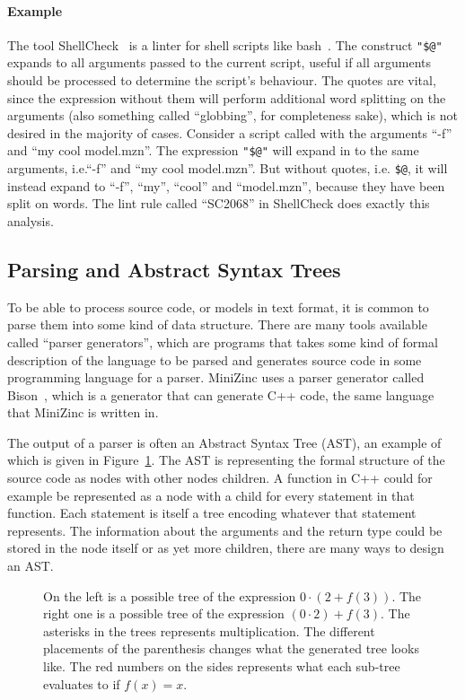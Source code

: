 \documentclass[a4paper,12pt]{article}
\begin{document}
\paragraph{Example}
The tool ShellCheck~\cite{shellcheck} is a linter for shell scripts like
bash~\cite{bash}. The construct \texttt{"\$@"} expands to all arguments passed to the
current script, useful if all arguments should be processed to determine the script's
behaviour. The quotes are vital, since the expression without them will perform additional
word splitting on the arguments (also something called ``globbing'', for completeness
sake), which is not desired in the majority of cases. Consider a script called with the
arguments ``-f'' and ``my cool model.mzn''. The expression \texttt{"\$@"} will expand in
to the same arguments, i.e.\@ ``-f'' and ``my cool model.mzn''. But without quotes, i.e.\@
\texttt{\$@}, it will instead expand to ``-f'', ``my'', ``cool'' and ``model.mzn'', because they
have been split on words. The lint
rule called ``SC2068'' in ShellCheck does exactly this analysis.

\subsection{Parsing and Abstract Syntax Trees}\label{sec:parsing}
To be able to process source code, or models in text format, it is common to parse them
into some kind of data structure. There are many tools available called ``parser
generators'', which are programs that takes some kind of formal description of the
language to be parsed and generates source code in some programming language for a parser.
MiniZinc uses a parser generator called Bison~\cite{flexbison}, which is a generator that
can generate C++ code, the same language that MiniZinc is written in.

The output of a parser is often an Abstract Syntax Tree (AST), an example of which is
given in Figure~\ref{fig:bkg:ast}. The AST is representing the formal structure of the
source code as nodes with other nodes children. A function in C++ could for example be
represented as a node with a child for every statement in that function. Each statement is
itself a tree encoding whatever that statement represents. The information
about the arguments and the return type could be stored in the node itself or as yet more
children, there are many ways to design an AST.

\begin{figure}[ht]
  \centering
  
  \caption{On the left is a possible tree of the expression $0\cdot(2+f(3))$. The right one
    is a possible tree of the expression $(0 \cdot 2)+f(3)$. The asterisks in the trees
    represents multiplication. The different placements of the parenthesis changes what the
    generated tree looks like. The red numbers on the sides represents what each sub-tree
    evaluates to if $f(x) = x$.}%
  \label{fig:bkg:ast}
\end{figure}
\end{document}
